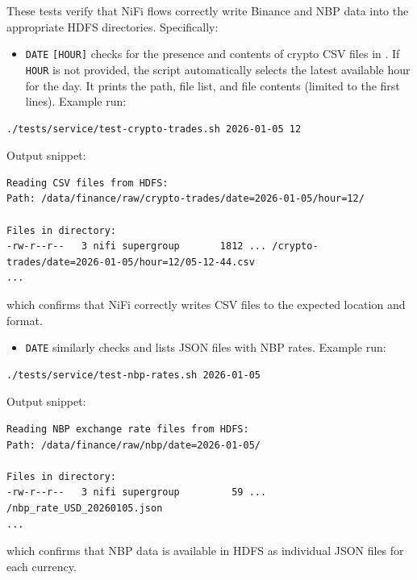 \documentclass{article}
\begin{document}
These tests verify that NiFi flows correctly write Binance and NBP data
into the appropriate HDFS directories. Specifically:

\begin{itemize}
\item
   \texttt{DATE} \texttt{[HOUR]}
  checks for the presence and contents of crypto CSV files in
  . If
  \texttt{HOUR} is not provided, the script automatically selects the
  latest available hour for the day. It prints the path, file list, and
  file contents (limited to the first lines). Example run:
\end{itemize}

\begin{lstlisting}
./tests/service/test-crypto-trades.sh 2026-01-05 12
\end{lstlisting}

Output snippet:

\begin{lstlisting}
Reading CSV files from HDFS:
Path: /data/finance/raw/crypto-trades/date=2026-01-05/hour=12/

Files in directory:
-rw-r--r--   3 nifi supergroup       1812 ... /crypto-trades/date=2026-01-05/hour=12/05-12-44.csv
...
\end{lstlisting}

which confirms that NiFi correctly writes CSV files to the expected
location and format.

\begin{itemize}
\item
   \texttt{DATE} similarly checks
   and lists JSON files with NBP
  rates. Example run:
\end{itemize}

\begin{lstlisting}
./tests/service/test-nbp-rates.sh 2026-01-05
\end{lstlisting}

Output snippet:

\begin{lstlisting}
Reading NBP exchange rate files from HDFS:
Path: /data/finance/raw/nbp/date=2026-01-05/

Files in directory:
-rw-r--r--   3 nifi supergroup         59 ... /nbp_rate_USD_20260105.json
...
\end{lstlisting}

which confirms that NBP data is available in HDFS as individual JSON
files for each currency.
\end{document}
